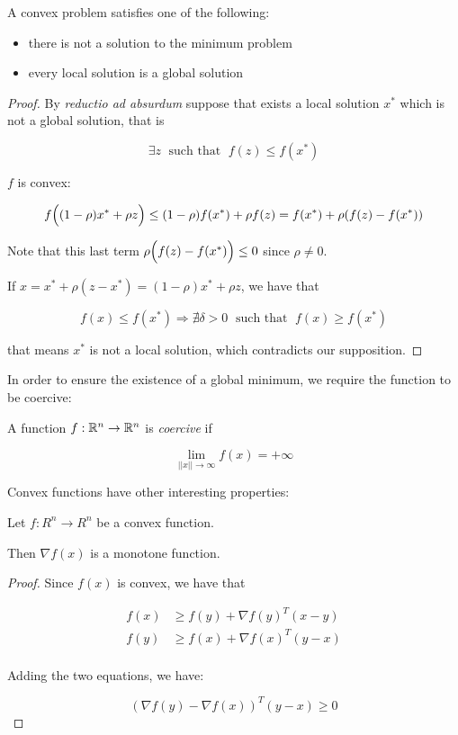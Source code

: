 \begin{theorem}
A convex problem satisfies one of the following:

\begin{itemize}
\item there is not a solution to the minimum problem
\item every local solution is a global solution
\end{itemize}

\begin{proof}

By \emph{reductio ad absurdum} suppose that exists a local solution $x^*$ which is not a global solution, that is

$$\exists z \; \mbox{ such that } \; f(z ) \leq f(x^*)$$

$f$ is convex:

$$f\Bigl((1-\rho) x^* + \rho z \Bigr) \leq (1-\rho)f(x^*) + \rho f(z) = f(x^*) + \rho(f(z)-f(x^*)) $$

Note that this last term $\rho\Bigl(f(z)-f(x^*)\Bigr) \leq 0$ since $ \rho \neq 0$.

If $x = x^* + \rho (z-x^*) = (1 -\rho) x^* + \rho z$, we have that

$$f(x) \leq f(x^*) \Rightarrow \nexists \delta > 0 \; \mbox{ such that }\; f(x) \geq f(x^*)$$

that means $x^*$ is not a local solution, which contradicts our supposition.
\end{proof}
\end{theorem}

In order to ensure the existence of a global minimum, we require the function to be coercive:

\begin{defi}
A function $f: \mathbb{R}^n \to \mathbb{R}^n$ is \emph{coercive} if

$$\lim_{||x|| \to \infty} f(x) = + \infty$$
\end{defi}

Convex functions have other interesting properties:

\begin{theorem} \label{app:monotone}
Let $f: R^n \to R^n$ be a convex function.

Then $\nabla f(x)$ is a monotone function.

\begin{proof}

Since $f(x)$ is convex, we have that

\begin{align*}
f(x) &\geq f(y) + \nabla f(y)^T (x-y) \\
f(y) &\geq f(x) + \nabla f(x)^T (y-x) \\
\end{align*}

Adding the two equations, we have:

$$(\nabla f(y) - \nabla f(x))^T (y-x) \geq 0$$
\end{proof}
\end{theorem}

